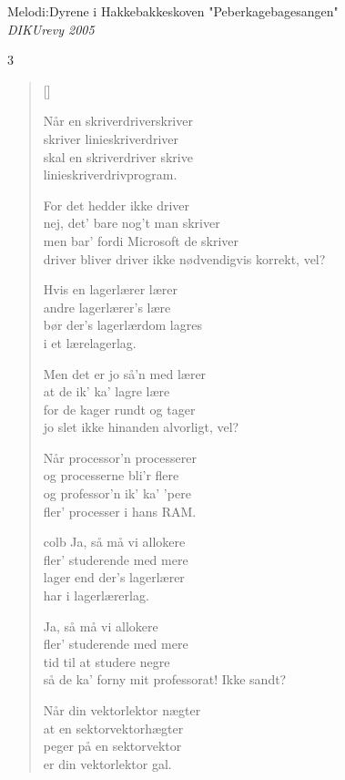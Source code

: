 {Melodi:Dyrene i Hakkebakkeskoven "Peberkagebagesangen"}\\[.2em]
{\small\itshape DIKUrevy 2005}
\begin{multicols}3
\settowidth{\versewidth}{men bar' fordi Microsoft de skriver}
\begin{verse}[\versewidth]

Når en skriverdriverskriver\\
skriver linieskriverdriver\\
skal en skriverdriver skrive\\
linieskriverdrivprogram.

For det hedder ikke driver\\
nej, det' bare nog't man skriver\\
men bar' fordi Microsoft de skriver\\
driver bliver driver ikke nødvendigvis korrekt, vel?

Hvis en lagerlærer lærer\\
andre lagerlærer's lære\\
bør der's lagerlærdom lagres\\
i et lærelagerlag.

Men det er jo så'n med lærer\\
at de ik' ka' lagre lære\\
for de kager rundt og tager\\
jo slet ikke hinanden alvorligt, vel?

Når processor'n processerer\\
og processerne bli'r flere\\
og professor'n ik' ka' 'pere\\
fler' processer i hans RAM.

{colb}
Ja, så må vi allokere\\
fler' studerende med mere\\
lager end der's lagerlærer\\
har i lagerlærerlag.

Ja, så må vi allokere\\
fler' studerende med mere\\
tid til at studere negre\\
så de ka' forny mit professorat! Ikke sandt?

Når din vektorlektor nægter\\
at en sektorvektorhægter\\
peger på en sektorvektor\\
er din vektorlektor gal.


\end{verse}
\end{multicols}
